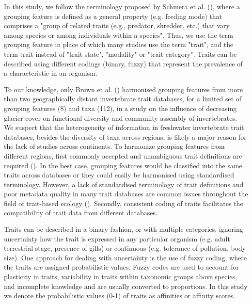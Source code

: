 \documentclass{article}
\begin{document}
In this study, we follow the terminology proposed by Schmera et al. (\cite{schmera_proposed_2015}), where a grouping feature is defined as a general property (e.g. feeding mode) that comprises a "group of related traits (e.g., predator, shredder, etc.) that vary among species or among individuals within a species". Thus, we use the term grouping feature in place of which many studies use the term "trait", and the term trait instead of "trait state", "modality" or "trait category". Traits can be described using different codings (binary, fuzzy) that represent the prevalence of a characteristic in an organism.

To our knowledge, only Brown et al. (\cite{brown_functional_2018}) harmonised grouping features from more than two geographically distant invertebrate trait databases, for a limited set of grouping features (8) and taxa (112), in a study on the influence of decreasing glacier cover on functional diversity and community assembly of invertebrates. We suspect that the heterogeneity of information in freshwater invertebrate trait databases, besides the diversity of taxa across regions, is likely a major reason for the lack of studies across continents. To harmonize grouping features from different regions, first commonly accepted and unambiguous trait definitions are required (\cite{schneider_towards_2019}). In the best case, grouping features would be classified into the same traits across databases or they could easily be harmonised using standardised terminology. However, a lack of standardised terminology of trait definitions and poor metadata quality in many trait databases are common issues throughout the field of trait-based ecology (\cite{baird_toward_2011, kissling_towards_2018}). Secondly, consistent coding of traits facilitates the compatibility of trait data from different databases. 

Traits can be described in a binary fashion, or with multiple categories, ignoring uncertainty how the trait is expressed in any particular organism (e.g. adult terrestrial stage, presence of gills) or continuous (e.g. tolerance of pollution, body size). One approach for dealing with uncertainty is the use of fuzzy coding, where the traits are assigned probabilistic values. Fuzzy codes are used to account for plasticity in traits, variability in traits within taxonomic groups above species, and incomplete knowledge and are usually converted to proportions. In this study we denote the probabilistic values (0-1) of traits as affinities or affinity scores.
\end{document}
